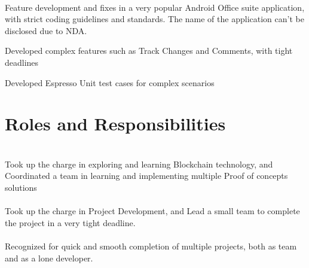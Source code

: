 \documentclass[]{resume}
\begin{document}
\\
Feature development and fixes in a very popular Android Office suite application, with strict coding guidelines and standards. The name of the application can’t be disclosed due to NDA.\\
\begin{tightemize}
	\item Developed complex features such as Track Changes and Comments, with tight deadlines
	\item Developed Espresso Unit test cases for complex scenarios
\end{tightemize}
\sectionsep


\section{Roles and Responsibilities}
  \\
Took up the charge in exploring and learning Blockchain technology, and Coordinated a team in learning and implementing multiple Proof of concepts solutions\\
\sectionsep
{}  \\
Took up the charge in Project Development, and Lead a small team to complete the project in a very tight deadline.\\
\sectionsep
{}  \\
Recognized for quick and smooth completion of multiple projects, both as team and as a lone developer.\\
\sectionsep
\ 
\end{document}

